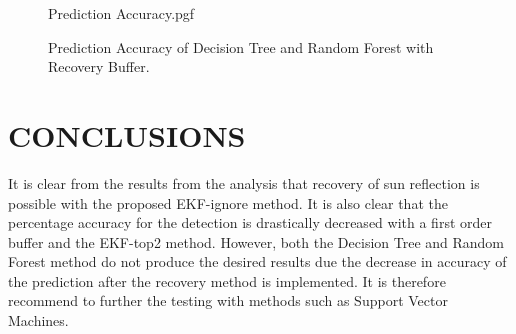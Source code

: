 \documentclass[letterpaper, 10 pt, conference]{ieeeconf}  %
\begin{document}
\begin{figure}[!htb]
	\begin{center}
		{Prediction Accuracy.pgf}
	\end{center}
	\caption[Prediction Accuracy of Decision Tree and Random Forest with Recovery Buffer]{Prediction Accuracy of Decision Tree and Random Forest with Recovery Buffer.}
	\label{fig:Prediction Accuracy EKF-ignore RF}
\end{figure}

\section{CONCLUSIONS}
It is clear from the results from the analysis that recovery of sun reflection is possible with the proposed EKF-ignore method. It is also clear that the percentage accuracy for the detection is drastically decreased with a first order buffer and the EKF-top2 method. However, both the Decision Tree and Random Forest method do not produce the desired results due the decrease in accuracy of the prediction after the recovery method is implemented. It is therefore recommend to further the testing with methods such as Support Vector Machines.

\addtolength{\textheight}{-12cm}   %






\end{document}
